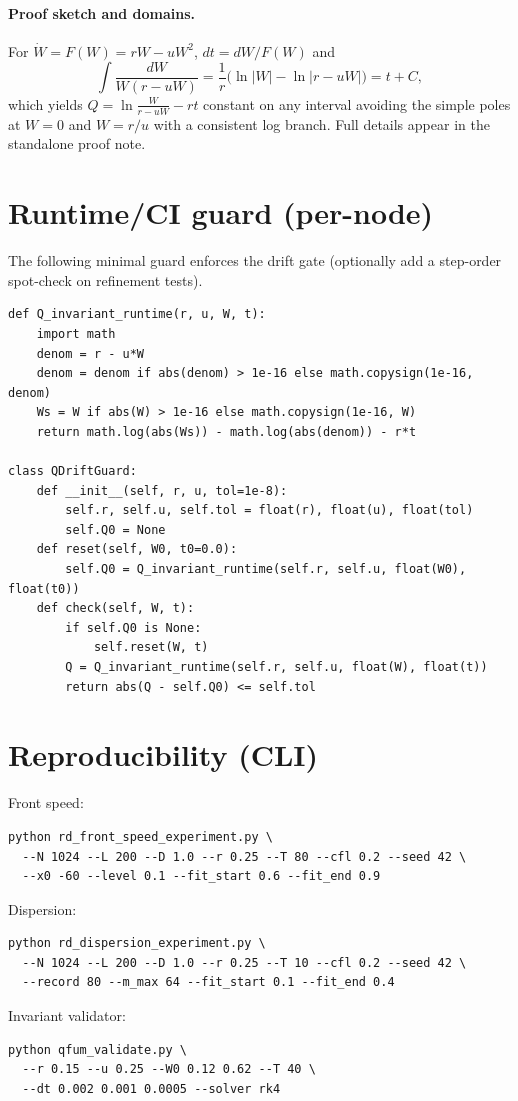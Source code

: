 \documentclass[11pt]{article}
\begin{document}
\paragraph{Proof sketch and domains.}
For $\dot W=F(W)=rW-uW^2$, $dt = dW/F(W)$ and
\[
\int \frac{dW}{W(r-uW)}=\frac{1}{r}\Big(\ln|W|-\ln|r-uW|\Big)=t+C,
\]
which yields $Q=\ln\!\frac{W}{r-uW}-rt$ constant on any interval avoiding the simple poles at $W=0$ and $W=r/u$ with a consistent log branch. Full details appear in the standalone proof note.

\section{Runtime/CI guard (per-node)}
The following minimal guard enforces the drift gate (optionally add a step-order spot-check on refinement tests).

\begin{verbatim}
def Q_invariant_runtime(r, u, W, t):
    import math
    denom = r - u*W
    denom = denom if abs(denom) > 1e-16 else math.copysign(1e-16, denom)
    Ws = W if abs(W) > 1e-16 else math.copysign(1e-16, W)
    return math.log(abs(Ws)) - math.log(abs(denom)) - r*t

class QDriftGuard:
    def __init__(self, r, u, tol=1e-8):
        self.r, self.u, self.tol = float(r), float(u), float(tol)
        self.Q0 = None
    def reset(self, W0, t0=0.0):
        self.Q0 = Q_invariant_runtime(self.r, self.u, float(W0), float(t0))
    def check(self, W, t):
        if self.Q0 is None:
            self.reset(W, t)
        Q = Q_invariant_runtime(self.r, self.u, float(W), float(t))
        return abs(Q - self.Q0) <= self.tol
\end{verbatim}

\section{Reproducibility (CLI)}
Front speed:
\begin{verbatim}
python rd_front_speed_experiment.py \
  --N 1024 --L 200 --D 1.0 --r 0.25 --T 80 --cfl 0.2 --seed 42 \
  --x0 -60 --level 0.1 --fit_start 0.6 --fit_end 0.9
\end{verbatim}
Dispersion:
\begin{verbatim}
python rd_dispersion_experiment.py \
  --N 1024 --L 200 --D 1.0 --r 0.25 --T 10 --cfl 0.2 --seed 42 \
  --record 80 --m_max 64 --fit_start 0.1 --fit_end 0.4
\end{verbatim}
Invariant validator:
\begin{verbatim}
python qfum_validate.py \
  --r 0.15 --u 0.25 --W0 0.12 0.62 --T 40 \
  --dt 0.002 0.001 0.0005 --solver rk4
\end{verbatim}
\end{document}

